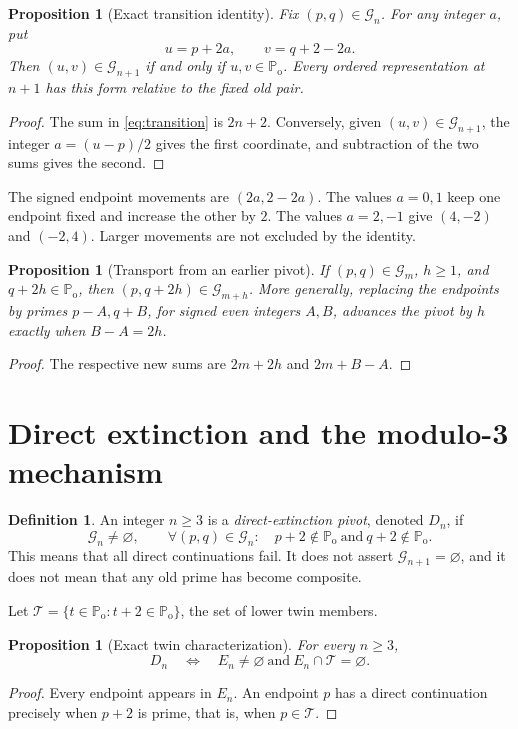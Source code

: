 \documentclass[11pt,a4paper]{article}
\newtheorem{proposition}[theorem]{Proposition}
\theoremstyle{definition}
\newtheorem{definition}[theorem]{Definition}
\theoremstyle{remark}
\newcommand{\Po}{\mathbb P_{\mathrm{o}}}
\newcommand{\G}{\mathcal G}
\newcommand{\Tw}{\mathcal T}
\begin{document}
\begin{proposition}[Exact transition identity]\label{prop:transition}
Fix $(p,q)\in\G_n$. For any integer $a$, put
\begin{equation}\label{eq:transition}
 u=p+2a,\qquad v=q+2-2a.
\end{equation}
Then $(u,v)\in\G_{n+1}$ if and only if $u,v\in\Po$. Every ordered representation at $n+1$ has this form relative to the fixed old pair.
\end{proposition}
\begin{proof}
The sum in \eqref{eq:transition} is $2n+2$. Conversely, given $(u,v)\in\G_{n+1}$, the integer $a=(u-p)/2$ gives the first coordinate, and subtraction of the two sums gives the second.
\end{proof}

The signed endpoint movements are $(2a,2-2a)$. The values $a=0,1$ keep one endpoint fixed and increase the other by $2$. The values $a=2,-1$ give $(4,-2)$ and $(-2,4)$. Larger movements are not excluded by the identity.

\begin{proposition}[Transport from an earlier pivot]\label{prop:earlier}
If $(p,q)\in\G_m$, $h\ge1$, and $q+2h\in\Po$, then $(p,q+2h)\in\G_{m+h}$. More generally, replacing the endpoints by primes $p-A,q+B$, for signed even integers $A,B$, advances the pivot by $h$ exactly when $B-A=2h$.
\end{proposition}
\begin{proof}
The respective new sums are $2m+2h$ and $2m+B-A$.
\end{proof}

\section{Direct extinction and the modulo-3 mechanism}
\begin{definition}
An integer $n\ge3$ is a \emph{direct-extinction pivot}, denoted $D_n$, if
\begin{equation}\label{eq:D}
 \G_n\ne\varnothing,\qquad
 \forall(p,q)\in\G_n:\quad p+2\notin\Po\ \text{and}\ q+2\notin\Po.
\end{equation}
This means that all direct continuations fail. It does not assert $\G_{n+1}=\varnothing$, and it does not mean that any old prime has become composite.
\end{definition}

Let $\Tw=\{t\in\Po:t+2\in\Po\}$, the set of lower twin members.
\begin{proposition}[Exact twin characterization]
For every $n\ge3$,
\[
 D_n\quad\Longleftrightarrow\quad
 E_n\ne\varnothing\ \text{and}\ E_n\cap\Tw=\varnothing.
\]
\end{proposition}
\begin{proof}
Every endpoint appears in $E_n$. An endpoint $p$ has a direct continuation precisely when $p+2$ is prime, that is, when $p\in\Tw$.
\end{proof}
\end{document}
